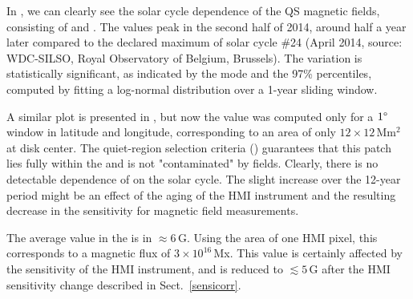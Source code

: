 \documentclass{aa}
\begin{document}
In , we can clearly see the solar cycle dependence of the 
QS
magnetic fields, consisting of \NW{} and \IN{}. The \brms{} values peak in the second half of 2014, 
around half a year
later compared to the
declared maximum of solar cycle \#24 (April 2014, source: WDC-SILSO, Royal Observatory of Belgium, Brussels). The variation is statistically significant, as indicated by the mode and the 97\% percentiles, computed by fitting a log-normal distribution over a 1-year sliding window.

A similar plot is presented in , but now the \brms{} value was computed only for a $1\degree$ window in latitude and longitude, corresponding to an area of only $12\times 12$\,Mm$^2$ at disk center. The quiet-region selection criteria () guarantees that this patch lies fully within the \IN{} and is not "contaminated" by \NW{} fields. Clearly, there is no detectable dependence of \brms{} on the solar cycle. The 
slight increase over the 12-year period might be an effect of the aging of the HMI instrument and the resulting decrease in the sensitivity for magnetic field measurements.

The average \brms{} value in the \IN{} is in $\approx6$\,G. Using the area of one HMI pixel, this corresponds to a magnetic flux of $3\times 10^{16}$\,Mx. 
This value is certainly affected by the sensitivity of the HMI instrument, and is reduced to $\lesssim5$\,G after the HMI sensitivity change described in Sect.~\ref{sensicorr}.


\end{document}
